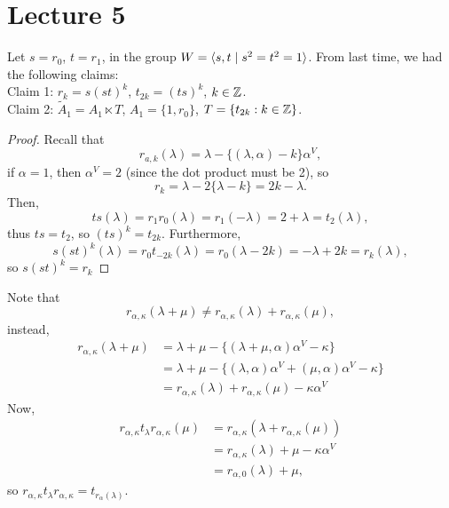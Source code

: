 \newpage
\section{Lecture 5}


Let $s = r_0$, $t = r_1$, in the group $W = \langle s, t \mid s^2 = t^2 = 1 \rangle$.
From last time, we had the following claims:
\\

\noindent
Claim 1: $r_k = s(st)^k$, $t_{2k} = (ts)^k$, $k \in \mathbb{Z}$.
\\

\noindent
Claim 2: $\tilde{A}_1 = A_1 \ltimes T$, $A_1 = \{1, r_0\}$, $T = \{t_{2k} : k \in
\mathbb{Z}\}$.
\\

\begin{proof}
Recall that
\[ r_{a,k}(\lambda) = \lambda - \{(\lambda, \alpha) - k\} \alpha^V, \]
if $\alpha = 1$, then $\alpha^V = 2$ (since the dot product must be 2), so
\[
    r_{k} = \lambda - 2 \{\lambda-k\} = 2k-\lambda.
\]
Then,
\[
    ts(\lambda) = r_1 r_0(\lambda) = r_1(-\lambda) = 2+\lambda = t_2(\lambda),
\]
thus $ts = t_2$, so $(ts)^k = t_{2k}$. Furthermore,
\[
    s(st)^k(\lambda) = r_0 t_{-2k}(\lambda) = r_0(\lambda-2k) = -\lambda + 2k = r_k(\lambda),
\]
so $s(st)^k = r_k$
\end{proof}

Note that
\[
    r_{\alpha,\kappa}(\lambda + \mu) \neq r_{\alpha,\kappa}(\lambda)
    + r_{\alpha,\kappa}(\mu),
\]
instead,
\begin{align*}
    r_{\alpha, \kappa} (\lambda+\mu)
    &= \lambda + \mu - \{(\lambda + \mu, \alpha) \alpha^V - \kappa\} \\
    &= \lambda + \mu - \{(\lambda, \alpha) \alpha^V + (\mu, \alpha) \alpha^V - \kappa\} \\
    &= r_{\alpha,\kappa}(\lambda) + r_{\alpha, \kappa}(\mu) - \kappa \alpha^V
\end{align*}
Now,
\begin{align*}
    r_{\alpha,\kappa} t_{\lambda} r_{\alpha, \kappa}(\mu)
    &= r_{\alpha, \kappa}(\lambda + r_{\alpha, \kappa}(\mu)) \\
    &= r_{\alpha, \kappa}(\lambda) + \mu - \kappa \alpha^V \\
    &= r_{\alpha,0}(\lambda) + \mu,
\end{align*}
so $r_{\alpha, \kappa} t_\lambda r_{\alpha, \kappa} = t_{r_\alpha(\lambda)}$.
\\

